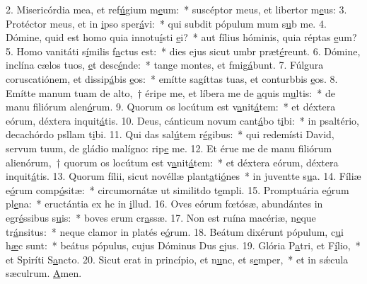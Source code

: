 2. Misericórdia mea, et ref\uline{ú}gium m\uline{e}um:~* suscéptor meus, et libertor m\uline{e}us:
3. Protéctor meus, et in \uline{i}pso sper\uline{á}vi:~* qui subdit pópulum mum s\uline{u}b me.
4. Dómine, quid est homo quia innotu\uline{í}sti \uline{e}i?~* aut fílius hóminis, quia réptas \uline{e}um?
5. Homo vanitáti s\uline{í}milis f\uline{a}ctus est:~* dies ejus sicut umbr præt\uline{é}reunt.
6. Dómine, inclína cælos tuos, \uline{e}t desc\uline{é}nde:~* tange montes, et fmig\uline{á}bunt.
7. Fúlgura coruscatiónem, et dissip\uline{á}bis \uline{e}os:~* emítte sagíttas tuas, et conturbbis \uline{e}os.
8. Emítte manum tuam de alto,~† éripe me, et líbera me de \uline{a}quis m\uline{u}ltis:~* de manu filiórum alen\uline{ó}rum.
9. Quorum os locútum est v\uline{a}nit\uline{á}tem:~* et déxtera eórum, déxtera inquit\uline{á}tis.
10. Deus, cánticum novum cant\uline{á}bo t\uline{i}bi:~* in psaltério, decachórdo psllam t\uline{i}bi.
11. Qui das sal\uline{ú}tem r\uline{é}gibus:~* qui redemísti David, servum tuum, de gládio malígno: rip\uline{e} me.
12. Et érue me de manu filiórum alienórum,~† quorum os locútum est v\uline{a}nit\uline{á}tem:~* et déxtera eórum, déxtera inquit\uline{á}tis.
13. Quorum fílii, sicut novéllæ plant\uline{a}ti\uline{ó}nes~* in juventte s\uline{u}a.
14. Fíliæ e\uline{ó}rum comp\uline{ó}sitæ:~* circumornátæ ut similitdo t\uline{e}mpli.
15. Promptuária e\uline{ó}rum pl\uline{e}na:~* eructántia ex hc in \uline{i}llud.
16. Oves eórum fœtósæ, abundántes in egr\uline{é}ssibus s\uline{u}is:~* boves erum cr\uline{a}ssæ.
17. Non est ruína macériæ, n\uline{e}que tr\uline{á}nsitus:~* neque clamor in platés e\uline{ó}rum.
18. Beátum dixérunt pópulum, c\uline{u}i h\uline{æ}c sunt:~* beátus pópulus, cujus Dóminus Dus \uline{e}jus.
19. Glória P\uline{a}tri, et F\uline{í}lio,~* et Spiríti S\uline{a}ncto.
20. Sicut erat in princípio, et n\uline{u}nc, et s\uline{e}mper,~* et in sǽcula sæculrum. \uline{A}men.
